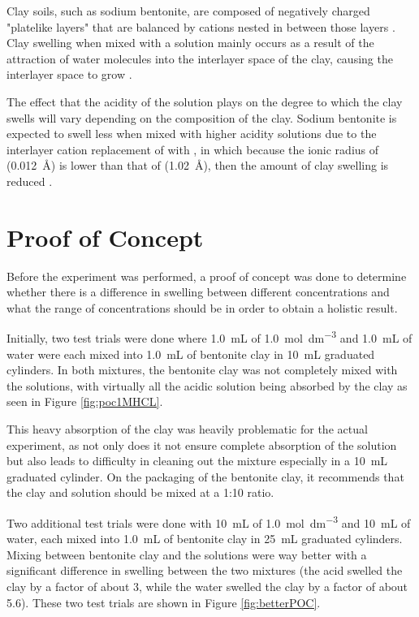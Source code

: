 \documentclass[11pt, letterpaper]{article}
\begin{document}
Clay soils, such as sodium bentonite, are composed of negatively charged
"platelike layers" that are balanced by cations nested in between
those layers \cite{chenClaySwellingRole2022}. Clay swelling when mixed with a solution mainly occurs
as a result of the attraction of water molecules into the interlayer space
of the clay, causing the interlayer space to grow \cite{chenClaySwellingRole2022}.

The effect that the acidity of the solution plays on the degree to which
the clay swells will vary depending on the composition of the clay.
Sodium bentonite is expected to swell less when mixed with higher acidity
solutions due to the interlayer cation replacement
of  with , in which because the
ionic radius of  (\SI{0.012}{\angstrom})
is lower than that of  (\SI{1.02}{\angstrom}),
then the amount of clay swelling is reduced \cite{ramavaraprasadSwellingCharacteristicsSoils2018a}.


\section{Proof of Concept}

Before the experiment was performed, a proof of concept
was done to determine whether there is a difference
in swelling between different concentrations and what the
range of concentrations should be in order to obtain
a holistic result.

Initially, two test trials were done where \SI{1.0}{mL} of
\SI{1.0}{mol.dm^{-3}}  and \SI{1.0}{mL} of water
were each mixed into \SI{1.0}{mL} of bentonite clay in
\SI{10}{mL} graduated cylinders. In both mixtures, the
bentonite clay was not completely mixed with the solutions,
with virtually all the acidic solution being absorbed by the
clay as seen in Figure \ref*{fig:poc1MHCL}.

This heavy absorption of the clay was heavily problematic
for the actual experiment, as not only does it not ensure
complete absorption of the solution but also leads to difficulty
in cleaning out the mixture especially in a \SI{10}{mL} graduated
cylinder. On the packaging of the bentonite clay, it recommends
that the clay and solution should be mixed at a 1:10 ratio.

Two additional test trials were done with \SI{10}{mL} of
\SI{1.0}{mol.dm^{-3}}  and \SI{10}{mL} of water,
each mixed into \SI{1.0}{mL} of bentonite clay in
\SI{25}{mL} graduated cylinders. Mixing between
bentonite clay and the solutions were way better with a
significant difference in swelling between the two mixtures
(the acid swelled the clay by a factor of about 3, while
the water swelled the clay by a factor of about 5.6).
These two test trials are shown in Figure \ref*{fig:betterPOC}.
\end{document}
